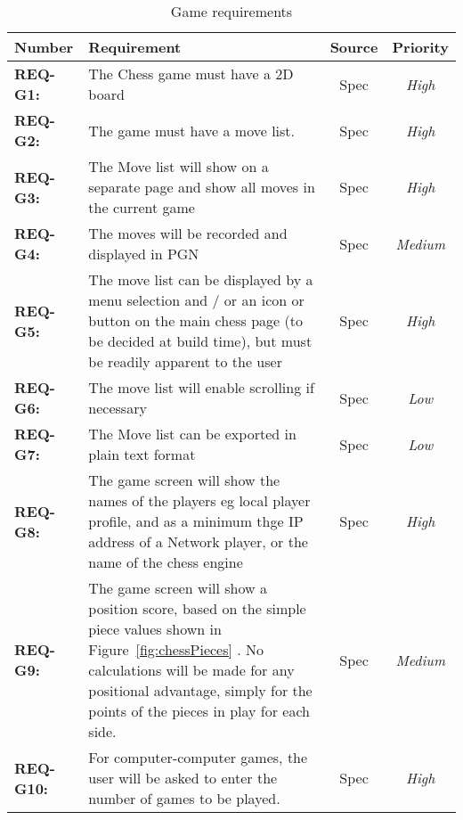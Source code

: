 \documentclass[a4paper,10pt]{article}
\begin{document}
\begin{table}[H]
\caption{Game requirements}
\label{table:gameReqs}
\begin{tabular}{|| l | p{10.5cm}  |  c  | c ||} \hline  
\textbf{Number} & \textbf{Requirement} & \textbf{Source} & \textbf{Priority}\\ \hline
\textbf{REQ-G1:}  & The Chess game must have a 2D board  & Spec & \textit{ High} \\

\textbf{REQ-G2:} 
&  The game must have a move list.
& Spec  &  \textit{High}\\

\textbf{REQ-G3:} 
&  The Move list will show on a separate page and show all moves in the current game
& Spec  &  \textit{High}\\

\textbf{REQ-G4:} 
& The moves will be recorded and displayed in PGN \cite{PGN-94}
& Spec  &  \textit{Medium}\\

\textbf{REQ-G5:} 
& The move list can be displayed by a menu selection and / or an icon or button on the main chess page (to be decided at build time), but must be readily apparent to the user
& Spec  &  \textit{High}\\

\textbf{REQ-G6:} 
& The move list will enable scrolling if necessary
& Spec  &  \textit{Low}\\

\textbf{REQ-G7:} 
& The Move list can be exported in plain text format
& Spec  &  \textit{Low}\\

\textbf{REQ-G8:} 
& The game screen will show the names of the players eg local player profile, and as a minimum thge IP address of a Network player, or the name of the chess engine
& Spec  &  \textit{High}\\

\textbf{REQ-G9:} 
& The game screen will show a position score, based on the simple piece values shown in Figure~\ref{fig:chessPieces} . No calculations will be made for any positional advantage, simply for the points of the pieces in play for each side.
& Spec  &  \textit{Medium}\\

\textbf{REQ-G10:} 
& For computer-computer games, the user will be asked to enter the number of games to be played.
& Spec  &  \textit{High}\\


\end{tabular}
\end{table}
\end{document}
